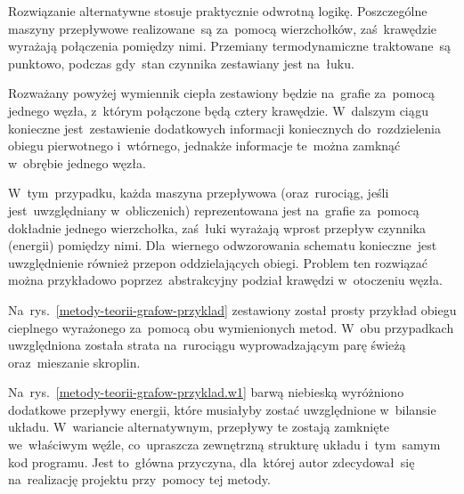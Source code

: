 Rozwiązanie alternatywne stosuje praktycznie odwrotną logikę.
Poszczególne maszyny przepływowe realizowane~są za~pomocą wierzchołków,
zaś~krawędzie wyrażają połączenia pomiędzy nimi. Przemiany
termodynamiczne traktowane~są punktowo, podczas gdy~stan czynnika
zestawiany jest na~łuku.

Rozważany powyżej wymiennik ciepła zestawiony będzie na~grafie za~pomocą
jednego węzła, z~którym połączone będą cztery krawędzie. W~dalszym ciągu
konieczne jest~zestawienie dodatkowych informacji koniecznych
do~rozdzielenia obiegu pierwotnego i~wtórnego, jednakże informacje
te~można zamknąć w~obrębie jednego węzła.

W~tym~przypadku, każda maszyna przepływowa (oraz~rurociąg, jeśli
jest~uwzględniany w~obliczenich) reprezentowana jest na~grafie za~pomocą
dokładnie jednego wierzchołka, zaś~łuki wyrażają wprost przepływ
czynnika (energii) pomiędzy nimi. Dla~wiernego odwzorowania schematu
konieczne~jest uwzględnienie również przepon oddzielających obiegi.
Problem ten rozwiązać można przykładowo poprzez~abstrakcyjny podział
krawędzi w~otoczeniu węzła.

Na~rys.~\ref{metody-teorii-grafow-przyklad} zestawiony został prosty
przykład obiegu cieplnego wyrażonego za~pomocą obu wymienionych metod.
W~obu przypadkach uwzględniona została strata na~rurociągu
wyprowadzającym parę świeżą oraz~mieszanie skroplin.

Na~rys.~\ref{metody-teorii-grafow-przyklad.w1} barwą niebieską
wyróżniono dodatkowe przepływy energii, które musiałyby zostać
uwzględnione w~bilansie układu. W~wariancie alternatywnym, przepływy te
zostają zamknięte we~właściwym węźle, co~upraszcza zewnętrzną strukturę
układu i~tym~samym kod programu. Jest to~główna przyczyna, dla~której
autor zdecydował~się na~realizację projektu przy~pomocy tej metody.
